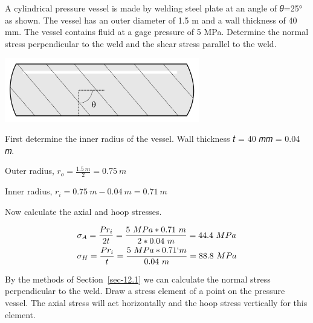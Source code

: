 \documentclass[
  letterpaper,
  DIV=11,
  numbers=noendperiod]{scrreprt}
\theoremstyle{definition}
\theoremstyle{remark}
\begin{document}
\begin{tcolorbox}[enhanced jigsaw, leftrule=.75mm, colbacktitle=quarto-callout-tip-color!10!white, breakable, opacityback=0, colback=white, titlerule=0mm, toprule=.15mm, colframe=quarto-callout-tip-color-frame, coltitle=black, title={Example 13.2}, toptitle=1mm, bottomrule=.15mm, rightrule=.15mm, left=2mm, arc=.35mm, opacitybacktitle=0.6, bottomtitle=1mm]

A cylindrical pressure vessel is made by welding steel plate at an angle
of 𝜃=25° as shown. The vessel has an outer diameter of 1.5 m and a wall
thickness of 40 mm. The vessel contains fluid at a gage pressure of 5
MPa. Determine the normal stress perpendicular to the weld and the shear
stress parallel to the weld.

\begin{center}
\includegraphics[width=3.34375in,height=\textheight]{images/CH13 PNGs/example 13.2 part 1.png}
\end{center}

\begin{tcolorbox}[enhanced jigsaw, leftrule=.75mm, colbacktitle=quarto-callout-tip-color!10!white, breakable, opacityback=0, colback=white, titlerule=0mm, toprule=.15mm, colframe=quarto-callout-tip-color-frame, coltitle=black, title={Solution}, toptitle=1mm, bottomrule=.15mm, rightrule=.15mm, left=2mm, arc=.35mm, opacitybacktitle=0.6, bottomtitle=1mm]

First determine the inner radius of the vessel. Wall thickness 𝑡 = 40 𝑚𝑚
= 0.04 𝑚.

Outer radius, \(r_o = \frac{1.5{~m}}{2} =0.75{~m}\)

Inner radius, \(r_i = 0.75{~m} - 0.04{~m} = 0.71{~m}\)

Now calculate the axial and hoop stresses.

\[
\begin{aligned}
& \sigma_A=\frac{Pr_i}{2t}=\frac{5{~MPa} * 0.71{~m}}{2 * 0.04{~m}}=44.4{~MPa} \\
& \sigma_H=\frac{Pr_i}{t}=\frac{5{~MPa} * 0.71{`m}}{0.04{~m}}=88.8{~MPa}
\end{aligned}
\]

By the methods of Section~\ref{sec-12.1} we can calculate the normal
stress perpendicular to the weld. Draw a stress element of a point on
the pressure vessel. The axial stress will act horizontally and the hoop
stress vertically for this element.


\end{tcolorbox}
\end{tcolorbox}
\end{document}
